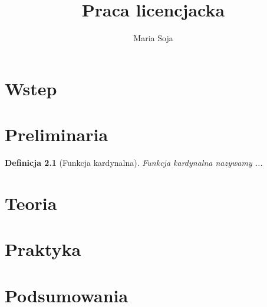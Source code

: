\documentclass[11pt,a4paper]{report}
\author{Maria Soja}
\title{Praca licencjacka}
\newtheorem{definition}{Definicja}
\begin{document}
\maketitle

\chapter{Wstep}

\chapter{Preliminaria}

\begin{definition}[Funkcja kardynalna\citep{engelking1989topologia}]
Funkcja kardynalna nazywamy ...
\end{definition}



\chapter{Teoria}

\chapter{Praktyka}

\chapter{Podsumowania}



\end{document}

